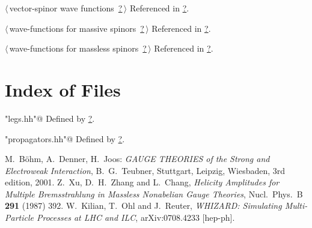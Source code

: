 \documentclass[a4paper,12pt]{amsart}
\renewcommand{\NWlink}[2]{\hyperlink{#1}{#2}}
\renewcommand{\NWtxtDefBy}{Defined by}
\renewcommand{\NWtxtRefIn}{Referenced in}
\begin{document}
{\begin{list}{}{\setlength{\itemsep}{-\parsep}\setlength{\itemindent}{-\leftmargin}}
\item $\langle\,$vector-spinor wave functions\nobreak\ {\footnotesize \NWlink{nuweb?}{?}}$\,\rangle$ {\footnotesize {\NWtxtRefIn} \NWlink{nuweb?}{?}.}
\item $\langle\,$wave-functions for massive spinors\nobreak\ {\footnotesize \NWlink{nuweb?}{?}}$\,\rangle$ {\footnotesize {\NWtxtRefIn} \NWlink{nuweb?}{?}.}
\item $\langle\,$wave-functions for massless spinors\nobreak\ {\footnotesize \NWlink{nuweb?}{?}}$\,\rangle$ {\footnotesize {\NWtxtRefIn} \NWlink{nuweb?}{?}.}
\end{list}}

\section{Index of Files}

{\small\begin{list}{}{\setlength{\itemsep}{-\parsep}\setlength{\itemindent}{-\leftmargin}}
\item \verb@"legs.hh"@ {\footnotesize {\NWtxtDefBy} \NWlink{nuweb?}{?}.}
\item \verb@"propagators.hh"@ {\footnotesize {\NWtxtDefBy} \NWlink{nuweb?}{?}.}
\end{list}}

\begin{thebibliography}{[8]}
M.~B\"ohm, A.~Denner, H.~Joos: \textit{GAUGE THEORIES
of the Strong and Electroweak Interaction}, B.~G.~Teubner, Stuttgart,
Leipzig, Wiesbaden, 3rd edition, 2001.
  Z.~Xu, D.~H.~Zhang and L.~Chang,
  \textit{Helicity Amplitudes for Multiple Bremsstrahlung
  in Massless Nonabelian Gauge Theories},
  Nucl.\ Phys.\  B {\bf 291} (1987) 392.
  W.~Kilian, T.~Ohl and J.~Reuter,
  \textit{WHIZARD: Simulating Multi-Particle Processes at LHC and ILC},
  arXiv:0708.4233 [hep-ph].
\end{thebibliography}
\end{document}
